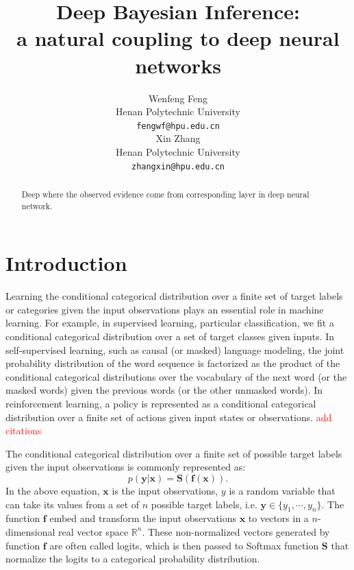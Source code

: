\documentclass{article}
\title{
  Deep Bayesian Inference: \\ a natural coupling to deep neural networks
}
\author{%
  Wenfeng Feng\\
  Henan Polytechnic University\\
  \texttt{fengwf@hpu.edu.cn} \\
  \And
  Xin Zhang\\
  Henan Polytechnic University\\
  \texttt{zhangxin@hpu.edu.cn} \\
}
\begin{document}
\maketitle


\begin{abstract}
  Deep
  where the observed evidence come from corresponding layer in deep neural network.
\end{abstract}


\section{Introduction}

Learning the conditional categorical distribution over a finite set of target labels or categories given the input observations plays an essential role in machine learning.
For example, in supervised learning, particular classification, we fit a conditional categorical distribution over a set of target classes given inputs. %
In self-supervised learning, such as causal (or masked) language modeling, the joint probability distribution of the word sequence is factorized as the product of the conditional categorical distributions over the vocabulary of the next word (or the masked words) given the previous words (or the other unmasked words).
In reinforcement learning, a policy is represented as a conditional categorical distribution over a finite set of actions given input states or observations.
\textcolor{red}{add citations}


The conditional categorical distribution over a finite set of possible target labels given the input observations is commonly represented as:
\begin{equation}
  p(\bm{y}|\bm{x}) = \bm{S}(\bm{f}(\bm{x})).
\end{equation}
In the above equation, $\bm{x}$ is the input observations, $y$ is a random variable that can take its values from a set of $n$ possible target labels, i.e. $\bm{y} \in \{y_1, \cdots, y_n\}$.
The function $\bm{f}$ embed and transform the input observations $\bm{x}$ to vectors in a $n$-dimensional real vector space $\mathbb{R}^n$.
These non-normalized vectors generated by function $\bm{f}$ are often called logits, which is then passed to Softmax function $\bm{S}$ that normalize the logits to a categorical probability distribution.
\end{document}
